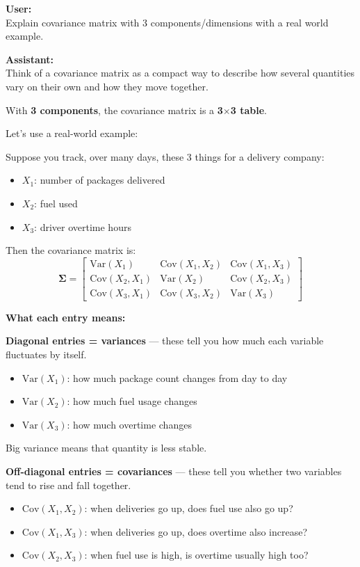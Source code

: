 \documentclass{article}
\begin{document}
\begin{mdframed}
\textbf{User:} \\
Explain covariance matrix with 3 components/dimensions with a real world example.

\bigskip
\textbf{Assistant:} \\
Think of a covariance matrix as a compact way to describe how several quantities vary on their own and how they move together.

With \textbf{3 components}, the covariance matrix is a \textbf{3$\times$3 table}.

Let's use a real-world example:

Suppose you track, over many days, these 3 things for a delivery company:
\begin{itemize}[leftmargin=*]
    \item $X_1$: number of packages delivered
    \item $X_2$: fuel used
    \item $X_3$: driver overtime hours
\end{itemize}

Then the covariance matrix is:
\[
\boldsymbol\Sigma =
\begin{bmatrix}
\mathrm{Var}(X_1) & \mathrm{Cov}(X_1, X_2) & \mathrm{Cov}(X_1, X_3) \\
\mathrm{Cov}(X_2, X_1) & \mathrm{Var}(X_2) & \mathrm{Cov}(X_2, X_3) \\
\mathrm{Cov}(X_3, X_1) & \mathrm{Cov}(X_3, X_2) & \mathrm{Var}(X_3)
\end{bmatrix}
\]

\textbf{What each entry means:}

\textbf{Diagonal entries = variances} --- these tell you how much each variable fluctuates by itself.
\begin{itemize}[leftmargin=*]
    \item $\mathrm{Var}(X_1)$: how much package count changes from day to day
    \item $\mathrm{Var}(X_2)$: how much fuel usage changes
    \item $\mathrm{Var}(X_3)$: how much overtime changes
\end{itemize}
Big variance means that quantity is less stable.

\textbf{Off-diagonal entries = covariances} --- these tell you whether two variables tend to rise and fall together.
\begin{itemize}[leftmargin=*]
    \item $\mathrm{Cov}(X_1, X_2)$: when deliveries go up, does fuel use also go up?
    \item $\mathrm{Cov}(X_1, X_3)$: when deliveries go up, does overtime also increase?
    \item $\mathrm{Cov}(X_2, X_3)$: when fuel use is high, is overtime usually high too?
\end{itemize}


\end{mdframed}
\end{document}

